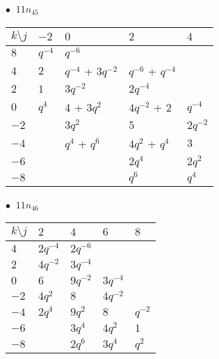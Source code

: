 \begin{minipage}{\linewidth}
$\bullet\ $ $11n_{45}$ \vspace{0.5em} \\
\begin{tabular}{l|llll}
$k \setminus j$ & $-2$ & $0$ & $2$ & $4$ \\
\hline
$8$ & $q^{-4}$ & $q^{-6}$ &  &  \\
$4$ & $2$ & $q^{-4}$ + $3q^{-2}$ & $q^{-6}$ + $q^{-4}$ &  \\
$2$ & $1$ & $3q^{-2}$ & $2q^{-4}$ &  \\
$0$ & $q^{4}$ & $4$ + $3q^{2}$ & $4q^{-2}$ + $2$ & $q^{-4}$ \\
$-2$ &  & $3q^{2}$ & $5$ & $2q^{-2}$ \\
$-4$ &  & $q^{4}$ + $q^{6}$ & $4q^{2}$ + $q^{4}$ & $3$ \\
$-6$ &  &  & $2q^{4}$ & $2q^{2}$ \\
$-8$ &  &  & $q^{6}$ & $q^{4}$ \\
\end{tabular}
\vspace{2em}
\end{minipage}
%
\begin{minipage}{\linewidth}
$\bullet\ $ $11n_{46}$ \vspace{0.5em} \\
\begin{tabular}{l|llll}
$k \setminus j$ & $2$ & $4$ & $6$ & $8$ \\
\hline
$4$ & $2q^{-4}$ & $2q^{-6}$ &  &  \\
$2$ & $4q^{-2}$ & $3q^{-4}$ &  &  \\
$0$ & $6$ & $9q^{-2}$ & $3q^{-4}$ &  \\
$-2$ & $4q^{2}$ & $8$ & $4q^{-2}$ &  \\
$-4$ & $2q^{4}$ & $9q^{2}$ & $8$ & $q^{-2}$ \\
$-6$ &  & $3q^{4}$ & $4q^{2}$ & $1$ \\
$-8$ &  & $2q^{6}$ & $3q^{4}$ & $q^{2}$ \\
\end{tabular}
\vspace{2em}
\end{minipage}
%
